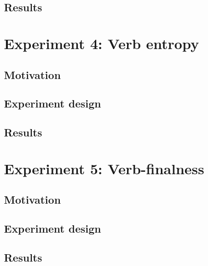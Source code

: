 \subsection{Results}

\section{Experiment 4: Verb entropy}
\subsection{Motivation}
\subsection{Experiment design}
\subsection{Results}

\section{Experiment 5: Verb-finalness}
\subsection{Motivation}
\subsection{Experiment design}
\subsection{Results}